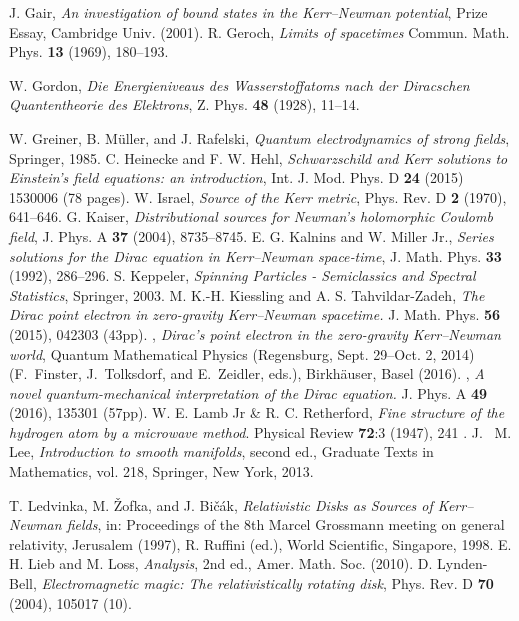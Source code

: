 \documentclass[11 pt]{article}
\renewcommand\({\left(}
\renewcommand\){\right)}
\newcommand\<{\langle}
\renewcommand\>{\rangle}
\newcommand\8{\infty}
\begin{document}
\begin{thebibliography}{10}
	J. Gair, \textit{An investigation of bound states in the {K}err--{N}ewman potential},
	Prize Essay, Cambridge Univ. (2001).
	 R. Geroch,
	\textit{Limits of spacetimes}
	Commun. Math. Phys. \textbf{13} (1969), 180--193.

W. Gordon, 
\textit{Die {E}nergieniveaus des {W}asserstoffatoms nach der {D}iracschen {Q}uantentheorie des {E}lektrons},
Z. Phys. {\bf 48} (1928), 11--14.

	W. Greiner, B. M\"uller, and J. Rafelski, 
	  \textit{Quantum electrodynamics of strong fields},
	{Springer}, 1985.
  C. Heinecke and F. W. Hehl,
  \textit{Schwarzschild and {K}err solutions to {E}instein's field equations: an introduction},
  Int. J. Mod. Phys. D \textbf{24} (2015) 1530006 (78 pages).
	 W. Israel, 
	\textit{Source of the {K}err metric},
	{Phys. Rev. D} \textbf{2} (1970), {641--646}.
  G. Kaiser, 
  \textit{Distributional sources for {N}ewman's holomorphic {C}oulomb field},
         {J. Phys. A} \textbf{37} (2004), {8735--8745}.
E. G. Kalnins
and
W. Miller Jr.,
 \textit{Series solutions for the Dirac equation in Kerr--Newman space‐time},
         {J. Math. Phys.} \textbf{33} (1992), {286--296}.
  S. Keppeler, 
  \textit{Spinning Particles - Semiclassics and Spectral Statistics},
         {Springer}, {2003}.
  M. K.-H. Kiessling and A. S. Tahvildar-Zadeh, 
  \textit{The Dirac point electron in zero-gravity Kerr--Newman spacetime.}
         {J. Math. Phys.} \textbf{56} (2015), 042303 (43pp).
\bysame,
 \emph{Dirac's point electron in the zero-gravity {K}err--{N}ewman world}, 
  Quantum {M}athematical {P}hysics (Regensburg, Sept. 29--Oct. 2, 2014) (F.~Finster, J.~Tolksdorf, and
  E.~Zeidler, eds.), Birkh\"auser, Basel (2016).
\bysame,
  \textit{A novel quantum-mechanical interpretation of the Dirac equation.}
              {J. Phys. A} \textbf{49} (2016), 135301 (57pp).
W. E. Lamb Jr \& R. C. Retherford,
\textit{ Fine structure of the hydrogen atom by a microwave method}.
 Physical Review {\bf 72}:3 (1947), 241 .
J. %
~M. Lee, \emph{Introduction to smooth manifolds}, second ed., Graduate Texts in Mathematics, vol. 218, Springer, New York, 2013.

T. Ledvinka, M. \v{Z}ofka, and J. Bi\v{c}\'ak, 
\textit{Relativistic Disks as Sources of {K}err--{N}ewman fields}, in:
{Proceedings of the 8th {M}arcel {G}rossmann meeting on general relativity, Jerusalem (1997)},
R. Ruffini (ed.), {World Scientific, Singapore}, 1998.
  E. H. Lieb and M. Loss,
  \textit{Analysis}, 2nd ed.,  Amer. Math. Soc. (2010).
  D. Lynden-Bell, 
  \textit{Electromagnetic magic: The relativistically rotating disk},
 {Phys. Rev. D} \textbf{70} (2004),  105017 (10).


\end{thebibliography}
\end{document}
